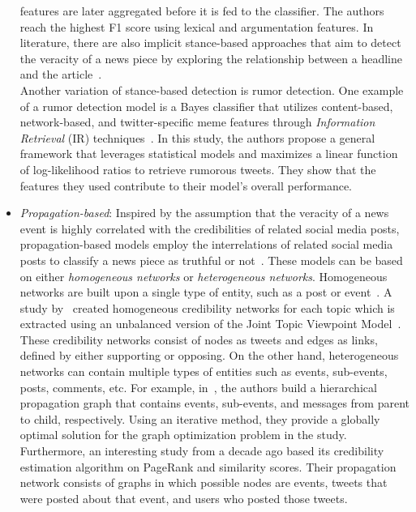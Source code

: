 \begin{itemize}
          features are later aggregated before it is fed to the classifier. The authors reach the highest F1 score using lexical and argumentation features. In literature, there are also implicit stance-based approaches that aim to detect the veracity of a news
          piece by exploring the relationship between a headline and the article~\parencite{ARetrospectiveAnalysisOfFNC_Hanselowski, StanceDetectionInFakeNews_Ghanem}.\\Another variation of stance-based detection is rumor detection. One example of a rumor detection model is a Bayes classifier that utilizes content-based, network-based, and twitter-specific meme features through \emph{Information Retrieval} (IR) techniques~\parencite{RumorHasIt_Qazvinian}.  In this study, the authors propose a general framework that leverages statistical models and maximizes a linear function of log-likelihood ratios to retrieve rumorous tweets. They show that the features they used contribute to their model's overall performance.
    \item  \emph{Propagation-based}: Inspired by the assumption that the veracity of a news event is highly correlated with the credibilities of related social media posts, propagation-based models employ the interrelations of related social media posts to classify a news piece as truthful or not~\parencite{FakeNewsDetectionOnSocialMediaADataMiningPerspective_Shu}. These models can be based on either \emph{homogeneous networks} or \emph{heterogeneous networks}.
          Homogeneous networks are built upon a single type of entity, such as a post or
          event~\parencite{NewsVerificationByExploitingConflictingSocialViewpoints_Jin}. A study
          by~\cite{NewsVerificationByExploitingConflictingSocialViewpoints_Jin} created homogeneous credibility networks for each topic which
          is extracted using an unbalanced version of the Joint Topic Viewpoint
          Model~\parencite{FindingAndArguingExpressions_Trabelsi}. These credibility networks consist of nodes as tweets and edges as links, defined by either supporting or opposing. On the other
          hand, heterogeneous networks can contain multiple types of entities such as events, sub-events, posts, comments, etc. For example, in~\parencite{NewsCredibilityEvaluationOnMicroblog_Jin}, the authors build a hierarchical propagation graph that contains events, sub-events, and messages from parent to child, respectively. Using an iterative method, they provide a globally optimal solution for the graph optimization problem in the study.\\Furthermore, an interesting study from a decade ago based its credibility estimation
          algorithm on PageRank and similarity scores. Their propagation network consists of graphs in which possible nodes are events, tweets that were posted about that event, and users who posted those tweets.
\end{itemize}
